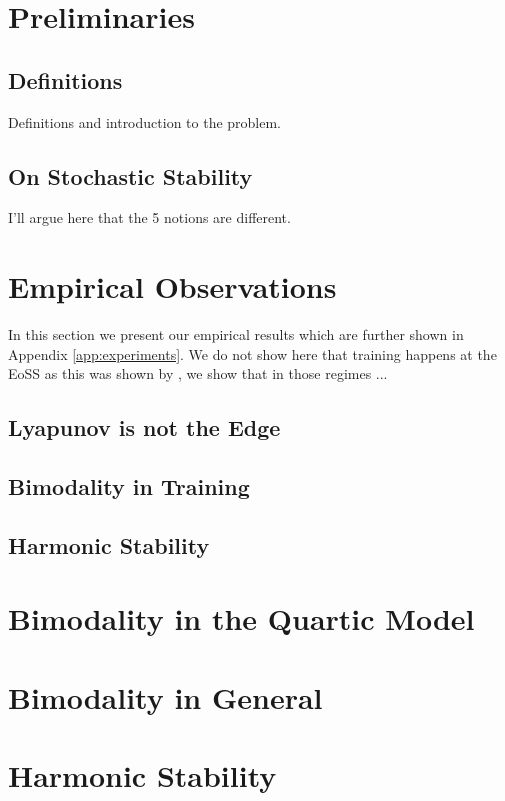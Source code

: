 \documentclass{article} %
\theoremstyle{plain}
\theoremstyle{definition}
\begin{document}
\section{Preliminaries}

\subsection{Definitions}
Definitions and introduction to the problem.


\subsection{On Stochastic Stability}
I'll argue here that the 5 notions are different.

\section{Empirical Observations}
In this section we present our empirical results which are further shown in Appendix \ref{app:experiments}. We do not show here that training happens at the EoSS as this was shown by \citet{andreyev}, we show that in those regimes ...
\subsection{Lyapunov is not the Edge}

\subsection{Bimodality in Training}

\subsection{Harmonic Stability}

\section{Bimodality in the Quartic Model}

\section{Bimodality in General}

\section{Harmonic Stability}
\end{document}
